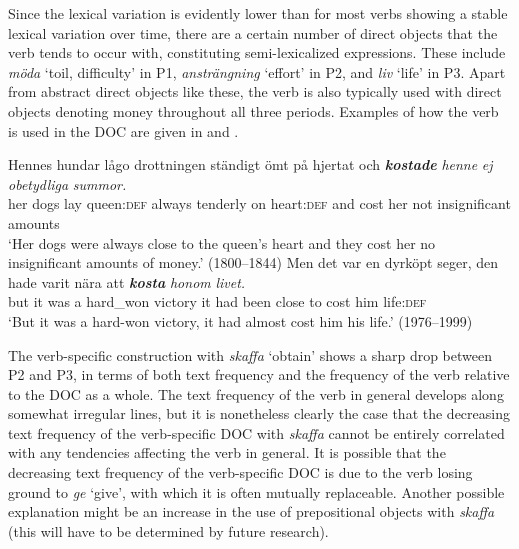 \documentclass[output=paper]{langscibook}
\begin{document}
Since the lexical variation is evidently lower than for most verbs showing a stable lexical variation over time, there are a certain number of direct objects that the verb tends to occur with, constituting semi-lexicalized expressions. These include \textit{möda} ‘toil, difficulty’ in P1, \textit{ansträngning} ‘effort’ in P2, and \textit{liv} ‘life’ in P3. Apart from abstract direct objects like these, the verb is also typically used with direct objects denoting money throughout all three periods. Examples of how the verb is used in the DOC are given in  and .


\ea \label{ex:valdeson:26}
\gll Hennes hundar  lågo  drottningen  ständigt  ömt       på  hjertat {och} \textbf{\textit{kostade}} \textit{henne} \textit{ej} \textit{obetydliga} \textit{summor.}\\
  her         dogs       lay     queen\textsc{:def}     always   tenderly on heart:\textsc{def} and   cost         her   not   insignificant     amounts\\
\glt ‘Her dogs were always close to the queen’s heart and they cost her no insignificant amounts of money.’ (1800–1844)
\ex \label{ex:valdeson:27}
\gll Men   det   var   en   dyrköpt     seger,   den   hade   varit   nära {att} \textbf{\textit{kosta}} \textit{honom}   \textit{livet.}\\
  but       it           was     a   hard\_won  victory   it  had  been close to   cost       him     life:\textsc{def}\\
\glt `But it was a hard-won victory, it had almost cost him his life.’ (1976–1999)
\z


\label{sec:valdeson:5.3.3.5}



The verb-specific construction with \textit{skaffa} ‘obtain’ shows a sharp drop between P2 and P3, in terms of both text frequency and the frequency of the verb relative to the DOC as a whole. The text frequency of the verb in general develops along somewhat irregular lines, but it is nonetheless clearly the case that the decreasing text frequency of the verb-specific DOC with \textit{skaffa} cannot be entirely correlated with any tendencies affecting the verb in general. It is possible that the decreasing text frequency of the verb-specific DOC is due to the verb losing ground to \textit{ge} ‘give’, with which it is often mutually replaceable. Another possible explanation might be an increase in the use of prepositional objects with \textit{skaffa} (this will have to be determined by future research).
\end{document}
